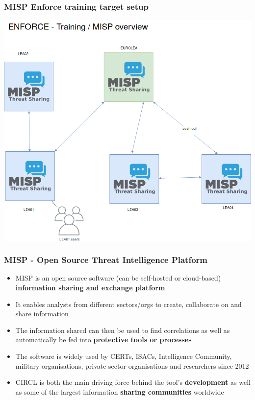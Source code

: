 \begin{frame}
        \frametitle{MISP Enforce training target setup}
        \includegraphics[scale=0.28]{enforce-misp.png}
\end{frame}


\begin{frame}
\frametitle{MISP - Open Source Threat Intelligence Platform}
        \begin{itemize}
                \item MISP is an open source software (can be self-hosted or cloud-based) {\bf information sharing and exchange platform}
                \item It enables analysts from different sectors/orgs to create, collaborate on and share information
                \item The information shared can then be used to find correlations as well as automatically be fed into {\bf protective tools or processes}
                \item The software is widely used by CERTs, ISACs, Intelligence Community, military organisations, private sector organisations and researchers since 2012
                \item CIRCL is both the main driving force behind the tool's {\bf development} as well as some of the largest information {\bf sharing communities} worldwide
        \end{itemize}
\end{frame}

